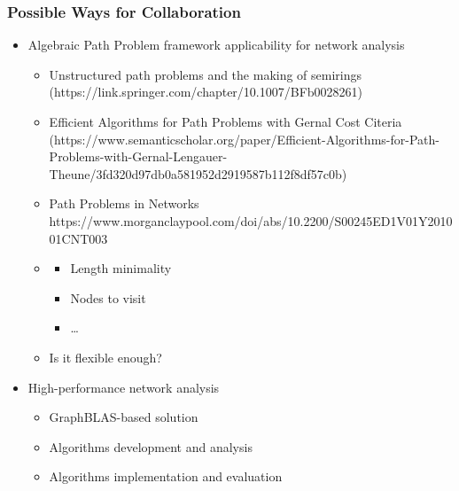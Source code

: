 \documentclass[xcolor=table,aspectratio=169]{beamer}
\begin{document}
\begin{frame}[fragile]
  \frametitle{Possible Ways for Collaboration}
    \begin{itemize}
      \item Algebraic Path Problem framework applicability for network analysis
      \begin{itemize}        
        \item Unstructured path problems and the making of semirings (https://link.springer.com/chapter/10.1007/BFb0028261)
        \item Efficient Algorithms for Path Problems with Gernal Cost Citeria (https://www.semanticscholar.org/paper/Efficient-Algorithms-for-Path-Problems-with-Gernal-Lengauer-Theune/3fd320d97db0a581952d2919587b112f8df57c0b)
        \item Path Problems in Networks https://www.morganclaypool.com/doi/abs/10.2200/S00245ED1V01Y201001CNT003
        \item 

        \begin{itemize}
          \item Length minimality
          \item Nodes to visit
          \item \ldots
        \end{itemize}
        \item Is it flexible enough?
      \end{itemize}
      \item High-performance network analysis
      \begin{itemize}        
        \item GraphBLAS-based solution
        \item Algorithms development and analysis
        \item Algorithms implementation and evaluation
      \end{itemize} 
    \end{itemize}
\end{frame}



\end{document}
